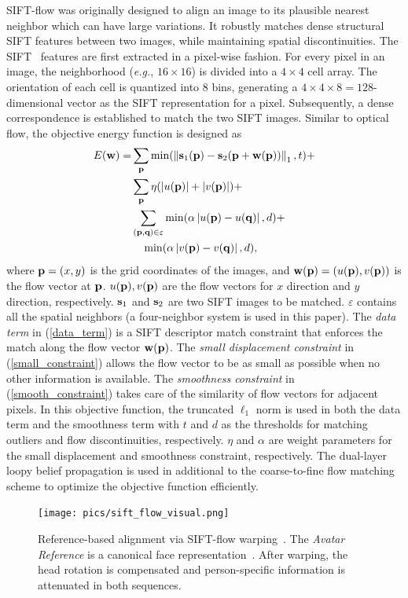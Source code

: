 \documentclass[journal]{IEEEtran}
\begin{document}
SIFT-flow was originally designed to align an image to its plausible nearest neighbor which can have large variations. It robustly matches dense structural SIFT features between two images, while maintaining spatial discontinuities. The SIFT~\cite{Lowe_ICCV99} features are first extracted in a pixel-wise fashion. For every pixel in an image, the neighborhood (\textit{e.g.}, $16\times16$) is divided into a $4\times4$ cell array. The orientation of each cell is quantized into 8 bins, generating a $4\times4\times8=128$-dimensional vector as the SIFT representation for a pixel. Subsequently, a dense correspondence is established to match the two SIFT images. Similar to optical flow, the objective energy function is designed as
\begin{align}
	\label{data_term}
	E(\w)=&\sum_\p \min (\left\|\s_1 (\p)-\s_2 (\p+\w(\p))\right\|_1 ,t)+
\\\label{small_constraint}
&\sum_\p \eta(\left|u(\p)\right|+\left|v(\p)\right|) +
\\\nonumber
&\sum_{(\p,\q)\in\varepsilon} \min(\alpha\left|u(\p)-u(\q)\right|,d)+
\\\label{smooth_constraint}
&~~~\min(\alpha\left|v(\p)-v(\q)\right|,d),
\end{align}
where ${\bf p}=(x,y)$ is the grid coordinates of the images, and ${\bf w}({\bf p})=(u({\bf p}),v({\bf p}))$ is the flow vector at ${\bf p}$. $u({\bf p}),v({\bf p})$ are the flow vectors for $x$ direction and $y$ direction, respectively. ${\bf s}_1$ and ${\bf s}_2$ are two SIFT images to be matched. $\varepsilon$ contains all the spatial neighbors (a four-neighbor system is used in this paper). The \emph{data term} in (\ref{data_term}) is a SIFT descriptor match constraint that enforces the match along the flow vector ${\bf w}({\bf p})$. The \emph{small displacement constraint} in (\ref{small_constraint}) allows the flow vector to be as small as possible when no other information is available. The \emph{smoothness constraint} in (\ref{smooth_constraint}) takes care of the similarity of flow vectors for adjacent pixels. In this objective function, the truncated $\ell_1$ norm is used in both the data term and the smoothness term with $t$ and $d$ as the thresholds for matching outliers and flow discontinuities, respectively. $\eta$ and $\alpha$ are weight parameters for the small displacement and smoothness constraint, respectively. The dual-layer loopy belief propagation is used in additional to the coarse-to-fine flow matching scheme to optimize the objective function efficiently.

\begin{figure}[htbp]
	\centering
		\texttt{[image: pics/sift\_flow\_visual.png]}
	\caption{Reference-based alignment via SIFT-flow warping~\cite{Liu_PAMI11}. The \textit{Avatar Reference} is a canonical face representation~\cite{Yang_SMCB12}. After warping, the head rotation is compensated and person-specific information is attenuated in both sequences.}
	\label{fig:sift_flow_visual}
\end{figure}
\end{document}
